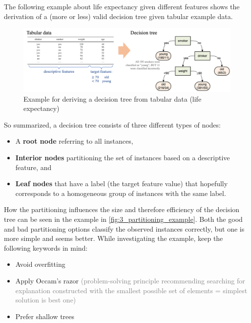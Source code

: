 The following example about life expectancy given different features shows the derivation of a (more or less) valid decision tree given tabular example data.

\begin{figure}[h]
  \centering
  \includegraphics[width=\textwidth]{assets/trees/basics/tab_to_tree.png}
  \caption{Example for deriving a decision tree from tabular data (life expectancy)}
  \label{fig:3_smoke_tree_example}
\end{figure}

So summarized, a decision tree consists of three different types of nodes:
\begin{itemize}
  \item A \textbf{root node} referring to all instances,
  \item \textbf{Interior nodes} partitioning the set of instances based on a descriptive feature, and
  \item \textbf{Leaf nodes} that have a label (the target feature value) that hopefully corresponds to a homogeneous group of instances with the same label.
\end{itemize}

How the partitioning influences the size and therefore efficiency of the decision tree can be seen in the example in \ref{fig:3_partitioning_example}. Both the good and bad partitioning options classify the observed instances correctly, but one is more simple and seems better. While investigating the example, keep the following keywords in mind:
\begin{itemize}
  \item Avoid overfitting
  \item Apply Occam's razor \textcolor{gray}{\footnotesize (problem-solving principle recommending searching for explanation constructed with the smallest possible set of elements = simplest solution is best one)}
  \item Prefer shallow trees
\end{itemize}

